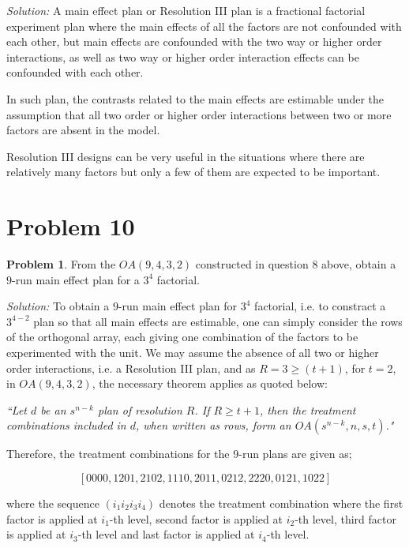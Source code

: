 \documentclass[12pt]{article}
\theoremstyle{definition}
\newtheorem*{prb}{Problem}
\newenvironment{problem}{
\begin{tcolorbox}[colback=blue!5!white,colframe=blue!75!black, parbox = true] \begin{prb}  }{\end{prb}\end{tcolorbox} }
\newenvironment{answer}{\textit{Solution: }\quad }{ \hfill \qedsymbol}
\begin{document}
\begin{answer}
	A main effect plan or Resolution III plan is a fractional factorial experiment plan where the main effects of all the factors are not confounded with each other, but main effects are confounded with the two way or higher order interactions, as well as two way or higher order interaction effects can be confounded with each other.
	
	In such plan, the contrasts related to the main effects are estimable under the assumption that all two order or higher order interactions between two or more factors are absent in the model.

	Resolution III designs can be very useful in the situations where there are relatively many factors but only a few of them are expected to be important.
\end{answer}


\section{Problem 10}

\begin{problem}
	From the $OA(9, 4, 3, 2)$ constructed in question 8 above, obtain a $9$-run main effect plan for a $3^4$ factorial.
\end{problem}

\begin{answer}
	To obtain a $9$-run main effect plan for $3^4$ factorial, i.e. to constract a $3^{4-2}$ plan so that all main effects are estimable, one can simply consider the rows of the orthogonal array, each giving one combination of the factors to be experimented with the unit. We may assume the absence of all two or higher order interactions, i.e. a Resolution III plan, and as $R = 3 \geq (t + 1)$, for $t = 2$, in $OA(9, 4, 3, 2)$, the necessary theorem applies as quoted below:

	\textit{
		 ``Let $d$ be an $s^{n-k}$ plan of resolution $R$. If $R \geq t + 1$, then the treatment combinations included in $d$, when written as rows, form an $OA(s^{n-k}, n, s, t)$."
	}

	Therefore, the treatment combinations for the $9$-run plans are given as;

	$$
	\left[  
		0000, 1201, 2102, 1110, 2011, 0212, 2220, 0121, 1022
	\right]
	$$

	where the sequence $(i_1i_2i_3i_4)$ denotes the treatment combination where the first factor is applied at $i_1$-th level, second factor is applied at $i_2$-th level, third factor is applied at $i_3$-th level and last factor is applied at $i_4$-th level.

\end{answer}
\end{document}
